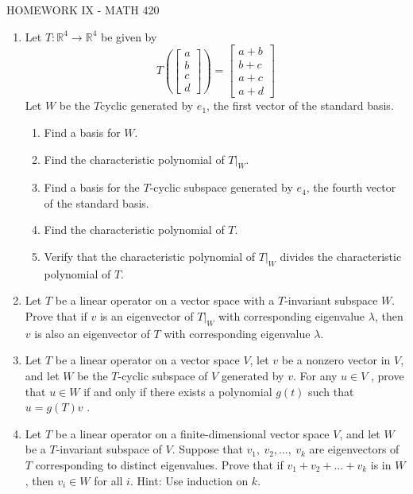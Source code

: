 \documentclass{article}
\begin{document}
\centerline{HOMEWORK IX - MATH 420}

\begin{enumerate}

\item Let $T:\mathbb{R}^4\rightarrow\mathbb{R}^4$ be given by
$$T\left(\left[\begin{array}{cccc}
a\\b\\c\\d\end{array}\right]\right)=\left[\begin{array}{cccc}
a+b\\b+c\\a+c\\a+d\end{array}\right]$$
Let $W$ be the $T$cyclic generated by $e_1$, the first vector of the standard basis.
\begin{enumerate}
\item Find a basis for $W$.
\item Find the characteristic polynomial of $T|_W$.
\item Find a basis for the $T$-cyclic subspace generated by $e_4$, the fourth vector of the standard basis.
\item Find the characteristic polynomial of $T$.
\item Verify that the characteristic polynomial of $T|_W$ divides the characteristic polynomial of $T$.
\end{enumerate}



\item Let $T$ be a linear operator on a vector space with a $T$-invariant subspace $W$. Prove that if $v$ is an eigenvector of
$T|_W$ with corresponding eigenvalue $\lambda$, then $v$ is also an eigenvector of $T$ with corresponding eigenvalue $\lambda$.


\item Let $T$ be a linear operator on a vector space $V$, let $v$ be a nonzero vector in $V$, and let $W$ be the $T$-cyclic subspace of $V$ generated by $v$. For any $u\in V$ , prove that $u\in W$  if and only if there exists a polynomial $g(t)$ such that $u=g(T)v$ .

\item Let $T$ be a linear operator on a finite-dimensional vector space $V$, and let $W$ be a $T$-invariant subspace of $V$. Suppose that
$v_1,\ v_2,\ldots,\ v_k$ are eigenvectors of $T$ corresponding to distinct eigenvalues. Prove that if
$v_1+v_2+\ldots+v_k$ is in $W$, then $v_i\in W$ for all $i$.  Hint: Use induction on $k$.




     \end{enumerate}
     
\end{document}
